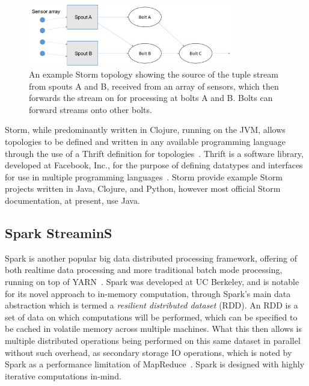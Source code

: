 \begin{figure}[ht]
  \centering
  \includegraphics[width=0.8\textwidth]{includes/figures/fig_storm_topology1}
  \caption{An example Storm topology showing the source of the tuple stream from spouts A and B, received from an array
  of sensors, which then forwards the stream on for processing at bolts A and B. Bolts can forward streams
  onto other bolts.}
  \label{fig:storm_topology}
\end{figure}

Storm, while predominantly written in Clojure, running on the JVM, allows topologies to be defined and written in any
available programming language through the use of a Thrift definition for topologies~\cite{About8:online}. Thrift is
a software library, developed at Facebook, Inc., for the purpose of defining datatypes and interfaces for use in
multiple programming languages~\cite{slee2007thrift}. Storm provide example Storm projects written in Java, Clojure,
and Python, however most official Storm documentation, at present, use Java.



\subsection{Spark StreaminS} %
\label{ssub:spark_streaming}

Spark is another popular big data distributed processing framework, offering of both realtime data processing
and more traditional batch mode processing, running on top of YARN~\cite{zaharia2010spark}. Spark was developed at UC
Berkeley, and is notable for its novel approach to in-memory computation, through Spark's main data abstraction which is
termed a \textit{resilient distributed dataset} (RDD). An RDD is a set of data on which computations will be performed,
which can be specified to be cached in volatile memory across multiple machines. What this then allows is multiple
distributed operations being performed on this same dataset in parallel without such overhead, as secondary storage
IO operations, which is noted by Spark as a performance limitation of MapReduce~\cite{davidson2013optimizing}. Spark is designed with highly iterative
computations in-mind.

